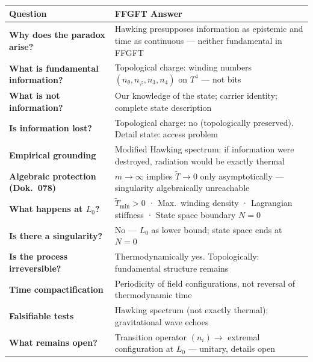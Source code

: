 \begin{longtable}{>{\bfseries}p{6cm} p{8cm}}
\toprule
Question & FFGFT Answer \\
\midrule
Why does the paradox arise? & Hawking presupposes information as epistemic and time as continuous --- neither fundamental in FFGFT \\
What is fundamental information? & Topological charge: winding numbers $(n_\theta, n_\varphi, n_3, n_4)$ on $T^4$ --- not bits \\
What is not information? & Our knowledge of the state; carrier identity; complete state description \\
Is information lost? & Topological charge: no (topologically preserved). Detail state: access problem \\
Empirical grounding & Modified Hawking spectrum: if information were destroyed, radiation would be exactly thermal \\
Algebraic protection (Dok.~078) & $m \rightarrow \infty$ implies $\tilde{T} \rightarrow 0$ only asymptotically --- singularity algebraically unreachable \\
What happens at $L_0$? & $\tilde{T}_\text{min} > 0$ · Max.\ winding density · Lagrangian stiffness · State space boundary $N=0$ \\
Is there a singularity? & No --- $L_0$ as lower bound; state space ends at $N = 0$ \\
Is the process irreversible? & Thermodynamically yes. Topologically: fundamental structure remains \\
Time compactification & Periodicity of field configurations, not reversal of thermodynamic time \\
Falsifiable tests & Hawking spectrum (not exactly thermal); gravitational wave echoes \\
What remains open? & Transition operator $(n_i) \rightarrow$ extremal configuration at $L_0$ --- unitary, details open \\
\bottomrule
\end{longtable}

